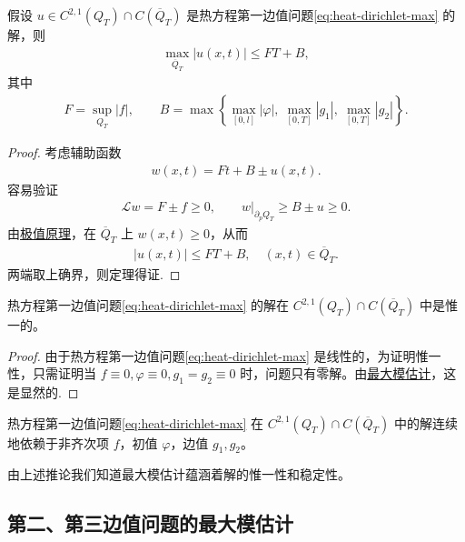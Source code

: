 \documentclass[../../main.tex]{subfiles}%
\begin{document}
\begin{theorem}\label{theorem:热方程第一边值问题的最大模估计}
假设 $u\in C^{2,1}(Q_T)\cap C(\overline{Q}_T)$ 是热方程第一边值问题\eqref{eq:heat-dirichlet-max} 的解，则
\begin{align}
\max_{\overline{Q}_T}|u(x,t)|\leqslant FT+B, \label{eq:heat-max-est1}
\end{align}
其中
\begin{align*}
F=\sup_{Q_T}|f|,\qquad B=\max\left\{\max_{[0,l]}|\varphi|,\ \max_{[0,T]}|g_1|,\ \max_{[0,T]}|g_2|\right\}.
\end{align*}
\end{theorem}
\begin{proof}
考虑辅助函数
\begin{align*}
w(x,t)=Ft+B\pm u(x,t).
\end{align*}
容易验证
\begin{align*}
\mathcal{L}w=F\pm f\geqslant 0,\qquad w|_{\partial_p Q_T}\geqslant B\pm u\geqslant 0.
\end{align*}
由\hyperref[theorem:PDE极值原理]{极值原理}，在 $\overline{Q}_T$ 上 $w(x,t)\geqslant 0$，从而
\begin{align*}
|u(x,t)|\leqslant FT+B,\quad (x,t)\in\overline{Q}_T.
\end{align*}
两端取上确界，则定理得证.
\end{proof}

\begin{corollary}
热方程第一边值问题\eqref{eq:heat-dirichlet-max} 的解在 $C^{2,1}(Q_T)\cap C(\overline{Q}_T)$ 中是惟一的。
\end{corollary}
\begin{proof}
由于热方程第一边值问题\eqref{eq:heat-dirichlet-max} 是线性的，为证明惟一性，只需证明当 $f\equiv 0,\varphi\equiv 0,g_1=g_2\equiv 0$ 时，问题只有零解。由\hyperref[theorem:热方程第一边值问题的最大模估计]{最大模估计}，这是显然的.
\end{proof}

\begin{corollary}
热方程第一边值问题\eqref{eq:heat-dirichlet-max} 在 $C^{2,1}(Q_T)\cap C(\overline{Q}_T)$ 中的解连续地依赖于非齐次项 $f$，初值 $\varphi$，边值 $g_1,g_2$。
\end{corollary}
\begin{remark}
由上述推论我们知道最大模估计蕴涵着解的惟一性和稳定性。
\end{remark}


\subsection{第二、第三边值问题的最大模估计}
\end{document}
